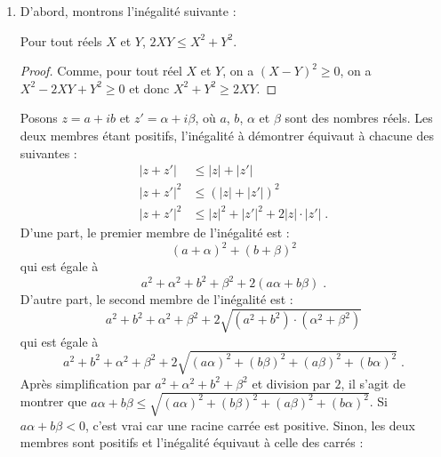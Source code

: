 \begin{corrige}
\begin{dem}
\begin{enumerate}
	      \item D'abord, montrons l'in\'egalit\'e suivante :
		            \begin{lem}
		                  \label{lem: inegalite x**2 + y**2 >= 2xy}
	                        Pour tout r\'eels $X$ et $Y$, $2 X Y \leq X^2 + Y^2$.
	      	            \end{lem}
	      	            \begin{proof}
	      	                  Comme, pour tout r\'eel $X$ et $Y$, on a $(X - Y)^2 \geq 0$, on a 
	      	                  $X^2 - 2 X Y + Y^2 \geq 0$ et donc $X^2 + Y^2 \geq 2 X Y $.
	      	            \end{proof}
	      	      Posons $z = a + i b$ et $z' = \alpha + i \beta$, o\`u $a$, $b$, $\alpha$ et $\beta$ sont des nombres r\'eels.
	      	      Les deux membres \'etant positifs, l'in\'egalit\'e \`a d\'emontrer \'equivaut \`a chacune des suivantes :
	            \begin{align*}
	                  |z + z'|                   
	                        & \leq 
	                              |z| + |z'|                                                                       \\
	                  |z + z'|^2                 
	                        & \leq 
	                              (|z| + |z'|)^2                                                                   \\
	                  |z + z'|^2                 
	                        & \leq 
	                              |z|^2 + |z'|^2 + 2 |z|\cdot |z'|                                                 \;.
	            \end{align*}
	            D'une part, le premier membre de l'in\'egalit\'e est : 
	                  \[
	                  (a+\alpha)^2 + (b+\beta)^2 
	                  \]
	            qui est \'egale \`a 
	                  \[
	                  a^2+\alpha^2+b^2+\beta^2+2(a\alpha+b\beta)                                                   \;.
	                  \]
	            D'autre part, le second membre de l'in\'egalit\'e est :
	                  \[
	                        a^2 +b^2 + \alpha^2 + \beta^2 + 2 \sqrt{(a^2+b^2)\cdot(\alpha^2+\beta^2)}
	                  \]
      	            qui est \'egale \`a 
	                  \[
	                        a^2+b^2+\alpha^2+\beta^2+2\sqrt{(a\alpha)^2+(b\beta)^2+(a\beta)^2+(b\alpha)^2}         \;.
	                  \]
                  Apr\`es simplification par $a^2+\alpha^2+b^2+\beta^2$ et division par $2$, il s'agit de montrer que $a\alpha + b\beta \leq \sqrt{(a\alpha)^2+(b\beta)^2+(a\beta)^2+(b\alpha)^2}$. Si $a\alpha + b\beta < 0$, c'est vrai car une racine carr\'ee est positive. Sinon, les deux membres sont positifs et l'in\'egalit\'e \'equivaut \`a celle des carr\'es :

\end{enumerate}
\end{dem}
\end{corrige}
